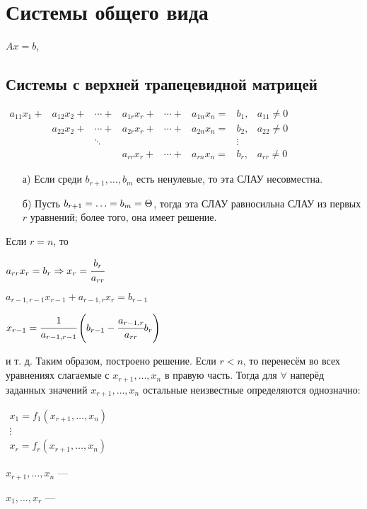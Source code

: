 \chapter{Системы общего вида}
$Ax=b$, 
\section{Системы с верхней трапецевидной матрицей}
$\begin{matrix}
a_{11}x_1+ & a_{12}x_2+& \cdots+ & a_{1r}x_r+ & \cdots+ & a_{1n}x_n = & b_1,   & a_{11}\neq0 \\
           & a_{22}x_2+& \cdots+ & a_{2r}x_r+ & \cdots+ & a_{2n}x_n = & b_2,   & a_{22}\neq0 \\
           &           & \ddots  &            &         &             & \vdots &             \\
           &           &         & a_{rr}x_r+ & \cdots+ & a_{rn}x_n = & b_r,   & a_{rr}\neq0
\end{matrix}$
\begin{itemize}
\item[а)] Если среди $b_{r+1},\ldots,b_m$ есть ненулевые, то эта СЛАУ несовместна.
\item[б)] Пусть $b_{r+1}=\ldots=b_m=\Theta$, тогда эта СЛАУ равносильна СЛАУ из первых $r$ уравнений; более того, она имеет решение.
\end{itemize}
Если $r=n$, то

$a_{rr}x_r=b_r \Rightarrow x_r=\cfrac{b_r}{a_{rr}}$

$a_{r-1,r-1}x_{r-1}+a_{r-1,r}x_r=b_{r-1}$

$x_{r-1}=\cfrac{1}{a_{r-1,r-1}}\left(b_{r-1}-\cfrac{a_{r-1,r}}{a_{rr}}b_r\right)$

и т. д.
Таким образом, построено решение.
Если $r<n$, то перенесём во всех уравнениях слагаемые с $x_{r+1},\ldots,x_n$ в правую часть. Тогда для $\forall$ наперёд заданных значений $x_{r+1},\ldots,x_n$ остальные неизвестные определяются однозначно:

$\begin{matrix}
x_1=f_1\left(x_{r+1},\ldots,x_n\right)\\
\vdots \\
x_r=f_r\left(x_{r+1},\ldots,x_n\right)
\end{matrix}$
\begin{opred}$x_{r+1},\ldots,x_n$ --- \end{opred}
\begin{opred}$x_{1},\ldots,x_r$ --- \end{opred}

